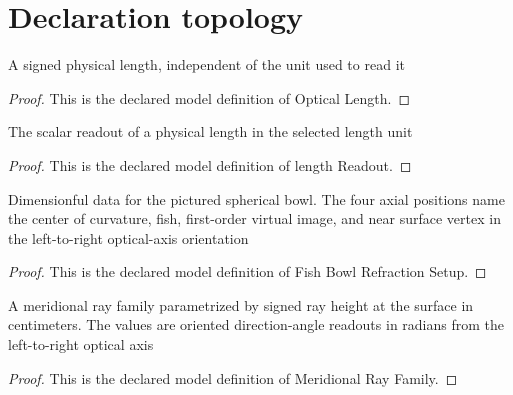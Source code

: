 \section{Declaration topology}
\begin{definition}
  \label{def:physics:phyx-mini-0055:phyxminiproblems-problemphyxmini0055-opticallength}
  A signed physical length, independent of the unit used to read it
\end{definition}
\begin{proof}
  This is the declared model definition of Optical Length.
\end{proof}
\begin{definition}
  \label{def:physics:phyx-mini-0055:phyxminiproblems-problemphyxmini0055-lengthreadout}
  The scalar readout of a physical length in the selected length unit
\end{definition}
\begin{proof}
  This is the declared model definition of length Readout.
\end{proof}
\begin{definition}
  \label{def:physics:phyx-mini-0055:phyxminiproblems-problemphyxmini0055-fishbowlrefractionsetup}
  Dimensionful data for the pictured spherical bowl. The four axial positions name the center of curvature, fish, first-order virtual image, and near surface vertex in the left-to-right optical-axis orientation
\end{definition}
\begin{proof}
  This is the declared model definition of Fish Bowl Refraction Setup.
\end{proof}
\begin{definition}
  \label{def:physics:phyx-mini-0055:phyxminiproblems-problemphyxmini0055-meridionalrayfamily}
  A meridional ray family parametrized by signed ray height at the surface in centimeters. The values are oriented direction-angle readouts in radians from the left-to-right optical axis
\end{definition}
\begin{proof}
  This is the declared model definition of Meridional Ray Family.
\end{proof}
